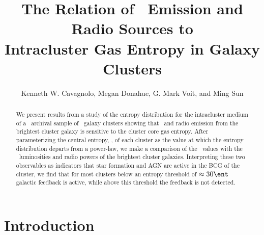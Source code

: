 \documentclass{emulateapj}
\begin{document}
\title{The Relation of \halpha\ Emission and Radio Sources to \\
  Intracluster Gas Entropy in Galaxy Clusters}
\author{
  Kenneth W. Cavagnolo,
  Megan Donahue,
  G. Mark Voit, 
  and Ming Sun}


\begin{abstract}
  We present results from a study of the entropy distribution for the
  intracluster medium of a \Chandra\ archival sample of \clnum\ galaxy
  clusters showing that \halpha\ and radio emission from the brightest
  cluster galaxy is sensitive to the cluster core gas entropy. After
  parameterizing the central entropy, \kna, of each cluster as the
  value at which the entropy distribution departs from a power-law, we
  make a comparison of the \kna\ values with the \halpha\ luminosities
  and radio powers of the brightest cluster galaxies. Interpreting
  these two observables as indicators that star formation and AGN are
  active in the BCG of the cluster, we find that for most clusters
  below an entropy threshold of $\approx 30 \ent$ galactic feedback is
  active, while above this threshold the feedback is not detected.
\end{abstract}


\section{Introduction}
\label{sec:intro}
\end{document}
